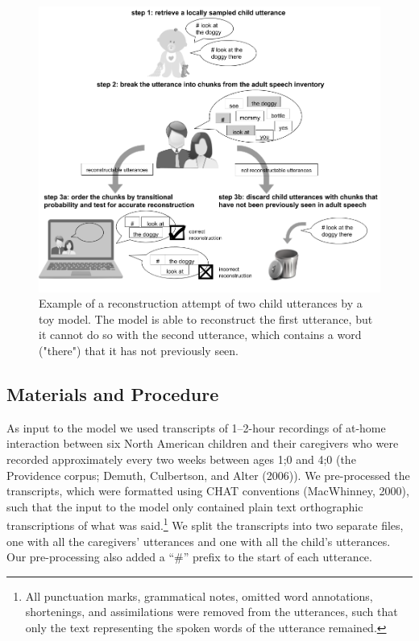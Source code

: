 \documentclass[man,mask,floatsintext]{apa6}
\let\rmarkdownfootnote\footnote%
\def\footnote{\protect\rmarkdownfootnote}
\begin{document}
\begin{figure}

{\centering \includegraphics[width=0.95\linewidth]{images/reconstruction_task} 

}

\caption{Example of a reconstruction attempt of two child utterances by a toy model. The model is able to reconstruct the first utterance, but it cannot do so with the second utterance, which contains a word  ("there") that it has not previously seen.}\label{fig:fig2}
\end{figure}

\subsection{Materials and Procedure}\label{materials-and-procedure}

As input to the model we used transcripts of 1--2-hour recordings of
at-home interaction between six North American children and their
caregivers who were recorded approximately every two weeks between ages
1;0 and 4;0 (the Providence corpus; Demuth, Culbertson, and Alter
(2006)). We pre-processed the transcripts, which were formatted using
CHAT conventions (MacWhinney, 2000), such that the input to the model
only contained plain text orthographic transcriptions of what was
said.\footnote{All punctuation marks, grammatical notes, omitted word
  annotations, shortenings, and assimilations were removed from the
  utterances, such that only the text representing the spoken words of
  the utterance remained.} We split the transcripts into two separate
files, one with all the caregivers' utterances and one with all the
child's utterances. Our pre-processing also added a \enquote{\#} prefix
to the start of each utterance.
\end{document}
